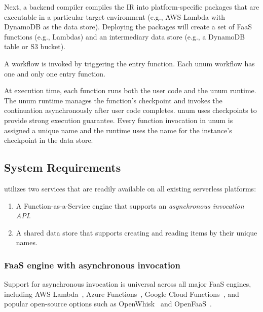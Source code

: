 Next, a backend compiler compiles the IR into platform-specific packages that
are executable in a particular target environment (e.g., AWS Lambda with
DynamoDB as the data store). Deploying the packages will create a set of FaaS
functions (e.g., Lambdas) and an intermediary data store (e.g., a DynamoDB
table or S3 bucket).

A workflow is invoked by triggering the entry function. Each unum workflow has
one and only one entry function. 

At execution time, each function runs both the user code and the unum runtime.
The unum runtime manages the function's checkpoint and invokes the
continuation asynchronously after user code completes. unum uses checkpoints
to provide strong execution guarantee. Every function invocation in unum is
assigned a unique name and the runtime uses the name for the instance's
checkpoint in the data store.

\subsection{System Requirements}\label{sec:design-req}

\name{} utilizes two services that are readily available on all existing
serverless platforms:

\begin{enumerate}

	\item A Function-as-a-Service engine that supports an
	\emph{asynchronous invocation API}.

	\item A shared data store that supports creating and reading items by
	 their unique names.

\end{enumerate}

\subsubsection{FaaS engine with asynchronous invocation}

Support for asynchronous invocation is universal across all major FaaS
engines, including AWS Lambda~\cite{aws-lambda-async-invoke}, Azure
Functions~\cite{azure-functions-async-invoke}, Google Cloud
Functions~\cite{google-cloud-functions-async-invoke}, and popular open-source
options such as OpenWhisk~\cite{openwhisk-async-invoke} and
OpenFaaS~\cite{openfaas-async-invoke}.


